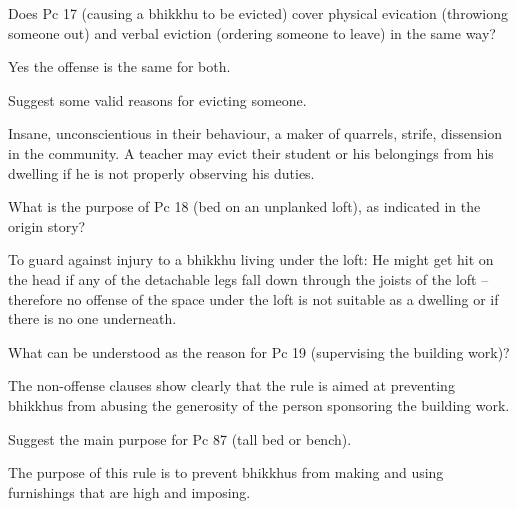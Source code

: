 \bigskip


Does Pc 17 (causing a bhikkhu to be evicted) cover physical evication (throwiong someone out) and verbal
eviction (ordering someone to leave) in the same way?

\begin{solution}
  Yes the offense is the same for both.
\end{solution}

\bigskip

Suggest some valid reasons for evicting someone.

\begin{solution}
  Insane, unconscientious in their behaviour, a maker of quarrels, strife,
  dissension in the community. A teacher may evict their student or his
  belongings from his dwelling if he is not properly observing his duties.
\end{solution}

\bigskip


What is the purpose of Pc 18 (bed on an unplanked loft), as indicated in the origin story?

\begin{solution}
  To guard against injury to a bhikkhu living under the loft: He might get hit
  on the head if any of the detachable legs fall down through the joists of the
  loft – therefore no offense of the space under the loft is not suitable as a
  dwelling or if there is no one underneath.
\end{solution}

\bigskip


What can be understood as the reason for Pc 19 (supervising the building work)?

\begin{solution}
  The non-offense clauses show clearly that the rule is aimed at preventing
  bhikkhus from abusing the generosity of the person sponsoring the building
  work.
\end{solution}

\bigskip


Suggest the main purpose for Pc 87 (tall bed or bench).

\begin{solution}
  The purpose of this rule is to prevent bhikkhus from making and using
  furnishings that are high and imposing.
\end{solution}

